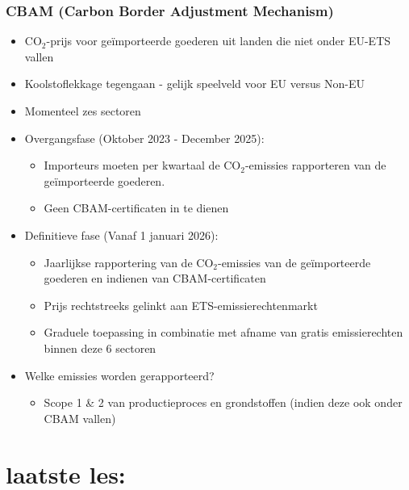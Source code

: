 \documentclass[12pt]{article}
\begin{document}
\subsubsection{CBAM (Carbon Border Adjustment Mechanism)}
\begin{itemize}
    \item CO$_2$-prijs voor geïmporteerde goederen uit landen die niet onder EU-ETS vallen
    \item Koolstoflekkage tegengaan - gelijk speelveld voor EU versus Non-EU 
    \item Momenteel zes sectoren
    \item Overgangsfase (Oktober 2023 - December 2025):\begin{itemize}
        \item Importeurs moeten per kwartaal de CO$_2$-emissies rapporteren van de geïmporteerde goederen.
        \item Geen CBAM-certificaten in te dienen
    \end{itemize}
    \item Definitieve fase (Vanaf 1 januari 2026):\begin{itemize}
        \item Jaarlijkse rapportering van de CO$_2$-emissies van de geïmporteerde goederen en indienen van CBAM-certificaten
        \item Prijs rechtstreeks gelinkt aan ETS-emissierechtenmarkt
        \item Graduele toepassing in combinatie met afname van gratis emissierechten binnen deze 6 sectoren
    \end{itemize}
    \item Welke emissies worden gerapporteerd?\begin{itemize}
        \item Scope 1 \& 2 van productieproces en grondstoffen (indien deze ook onder CBAM vallen)
    \end{itemize}
\end{itemize}
\section{laatste les:}
\end{document}

